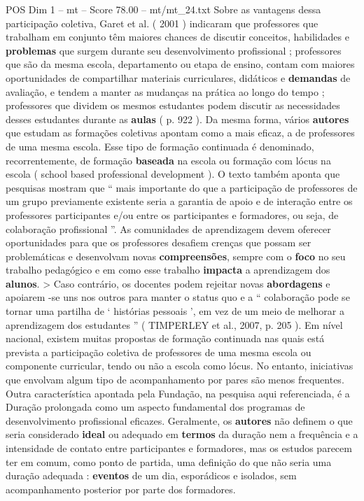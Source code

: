 \begin{textsample}{POS Dim 1 – mt – Score 78.00 – mt/mt\_24.txt}
Sobre as vantagens dessa participação coletiva, Garet et al. ( 2001 ) indicaram que professores que trabalham em conjunto têm maiores chances de discutir conceitos, habilidades e \textbf{problemas} que surgem durante seu desenvolvimento profissional ; professores que são da mesma escola, departamento ou etapa de ensino, contam com maiores oportunidades de compartilhar materiais curriculares, didáticos e \textbf{demandas} de avaliação, e tendem a manter as mudanças na prática ao longo do tempo ; professores que dividem os mesmos estudantes podem discutir as necessidades desses estudantes durante as \textbf{aulas} ( p. 922 ).
Da mesma forma, vários \textbf{autores} que estudam as formações coletivas apontam como a mais eficaz, a de professores de uma mesma escola.
Esse tipo de formação continuada é denominado, recorrentemente, de formação \textbf{baseada} na escola ou formação com lócus na escola ( school based professional development ).
O texto também aponta que pesquisas mostram que “ mais importante do que a participação de professores de um grupo previamente existente seria a garantia de apoio e de interação entre os professores participantes e/ou entre os participantes e formadores, ou seja, de colaboração profissional ”.
As comunidades de aprendizagem devem oferecer oportunidades para que os professores desafiem crenças que possam ser problemáticas e desenvolvam novas \textbf{compreensões}, sempre com o \textbf{foco} no seu trabalho pedagógico e em como esse trabalho \textbf{impacta} a aprendizagem dos \textbf{alunos}. > Caso contrário, os docentes podem rejeitar novas \textbf{abordagens} e apoiarem -se uns nos outros para manter o status quo e a “ colaboração pode se tornar uma partilha de ‘ histórias pessoais ’, em vez de um meio de melhorar a aprendizagem dos estudantes ” ( TIMPERLEY et al., 2007, p. 205 ).
Em nível nacional, existem muitas propostas de formação continuada nas quais está prevista a participação coletiva de professores de uma mesma escola ou componente curricular, tendo ou não a escola como lócus.
No entanto, iniciativas que envolvam algum tipo de acompanhamento por pares são menos frequentes.
Outra característica apontada pela Fundação, na pesquisa aqui referenciada, é a Duração prolongada como um aspecto fundamental dos programas de desenvolvimento profissional eficazes.
Geralmente, os \textbf{autores} não definem o que seria considerado \textbf{ideal} ou adequado em \textbf{termos} da duração nem a frequência e a intensidade de contato entre participantes e formadores, mas os estudos parecem ter em comum, como ponto de partida, uma definição do que não seria uma duração adequada : \textbf{eventos} de um dia, esporádicos e isolados, sem acompanhamento posterior por parte dos formadores.

\end{textsample}

